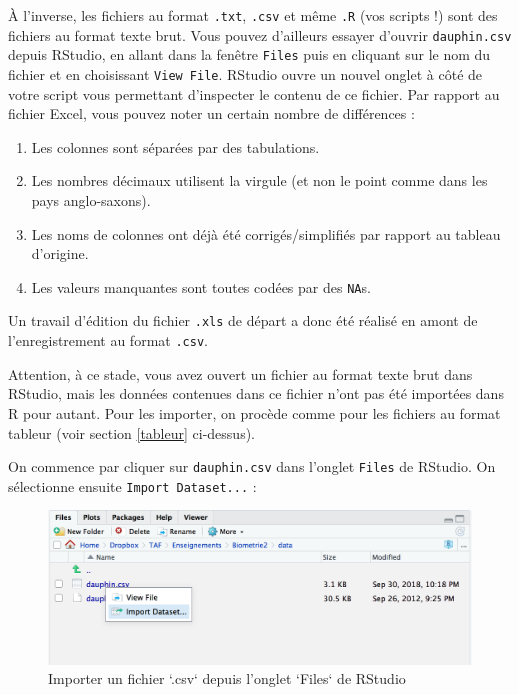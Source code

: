 \documentclass[a4paperpaper,]{article}
\providecommand{\tightlist}{%
  \setlength{\itemsep}{0pt}\setlength{\parskip}{0pt}}
\begin{document}
À l'inverse, les fichiers au format \texttt{.txt}, \texttt{.csv} et même \texttt{.R} (vos scripts !) sont des fichiers au format texte brut. Vous pouvez d'ailleurs essayer d'ouvrir \texttt{dauphin.csv} depuis RStudio, en allant dans la fenêtre \texttt{Files} puis en cliquant sur le nom du fichier et en choisissant \texttt{View\ File}. RStudio ouvre un nouvel onglet à côté de votre script vous permettant d'inspecter le contenu de ce fichier. Par rapport au fichier Excel, vous pouvez noter un certain nombre de différences :

\begin{enumerate}
\def\labelenumi{\arabic{enumi}.}
\tightlist
\item
  Les colonnes sont séparées par des tabulations.
\item
  Les nombres décimaux utilisent la virgule (et non le point comme dans les pays anglo-saxons).
\item
  Les noms de colonnes ont déjà été corrigés/simplifiés par rapport au tableau d'origine.
\item
  Les valeurs manquantes sont toutes codées par des \texttt{NA}s.
\end{enumerate}

Un travail d'édition du fichier \texttt{.xls} de départ a donc été réalisé en amont de l'enregistrement au format \texttt{.csv}.

Attention, à ce stade, vous avez ouvert un fichier au format texte brut dans RStudio, mais les données contenues dans ce fichier n'ont pas été importées dans R pour autant. Pour les importer, on procède comme pour les fichiers au format tableur (voir section \ref{tableur} ci-dessus).

On commence par cliquer sur \texttt{dauphin.csv} dans l'onglet \texttt{Files} de RStudio. On sélectionne ensuite \texttt{Import\ Dataset...} :

\begin{figure}[htpb]

{\centering \includegraphics[width=0.8\linewidth]{images/importcsv1} 

}

\caption{Importer un fichier `.csv` depuis l'onglet `Files` de RStudio}\label{fig:importcsv1}
\end{figure}
\end{document}
